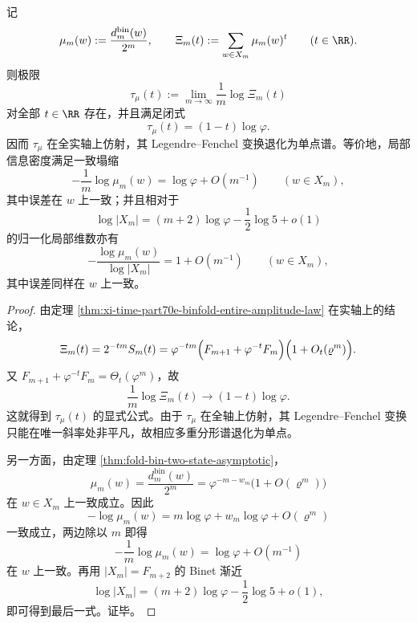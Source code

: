\begin{corollary}[全实轴仿射压力与单谱塌缩]\label{cor:xi-time-part70e-affine-pressure-monofractal}
记
\[
\mu_m(w):=\frac{d_m^{\mathrm{bin}}(w)}{2^m},
\qquad
\Xi_m(t):=\sum_{w\in X_m}\mu_m(w)^t
\qquad (t\in\RR).
\]
则极限
\[
\tau_\mu(t):=\lim_{m\to\infty}\frac1m\log \Xi_m(t)
\]
对全部 \(t\in\RR\) 存在，并且满足闭式
\[
\tau_\mu(t)=(1-t)\log\varphi.
\]
因而 \(\tau_\mu\) 在全实轴上仿射，其 Legendre--Fenchel 变换退化为单点谱。等价地，局部信息密度满足一致塌缩
\[
-\frac1m\log \mu_m(w)=\log\varphi+O(m^{-1})
\qquad (w\in X_m),
\]
其中误差在 \(w\) 上一致；并且相对于
\[
\log|X_m|=(m+2)\log\varphi-\frac12\log 5+o(1)
\]
的归一化局部维数亦有
\[
-\frac{\log\mu_m(w)}{\log|X_m|}=1+O(m^{-1})
\qquad (w\in X_m),
\]
其中误差同样在 \(w\) 上一致。
\end{corollary}
\begin{proof}
由定理 \ref{thm:xi-time-part70e-binfold-entire-amplitude-law} 在实轴上的结论，
\[
\Xi_m(t)=2^{-tm}S_m(t)
=
\varphi^{-tm}\Bigl(F_{m+1}+\varphi^{-t}F_m\Bigr)\Bigl(1+O_t(\varrho^m)\Bigr).
\]
又 \(F_{m+1}+\varphi^{-t}F_m=\Theta_t(\varphi^m)\)，故
\[
\frac1m\log\Xi_m(t)\to (1-t)\log\varphi.
\]
这就得到 \(\tau_\mu(t)\) 的显式公式。由于 \(\tau_\mu\) 在全轴上仿射，其 Legendre--Fenchel 变换只能在唯一斜率处非平凡，故相应多重分形谱退化为单点。

另一方面，由定理 \ref{thm:fold-bin-two-state-asymptotic}，
\[
\mu_m(w)=\frac{d_m^{\mathrm{bin}}(w)}{2^m}
=
\varphi^{-m-w_m}\bigl(1+O(\varrho^m)\bigr)
\]
在 \(w\in X_m\) 上一致成立。因此
\[
-\log\mu_m(w)=m\log\varphi+w_m\log\varphi+O(\varrho^m)
\]
一致成立，两边除以 \(m\) 即得
\[
-\frac1m\log\mu_m(w)=\log\varphi+O(m^{-1})
\]
在 \(w\) 上一致。再用 \(|X_m|=F_{m+2}\) 的 Binet 渐近
\[
\log|X_m|=(m+2)\log\varphi-\frac12\log5+o(1),
\]
即可得到最后一式。证毕。
\end{proof}

